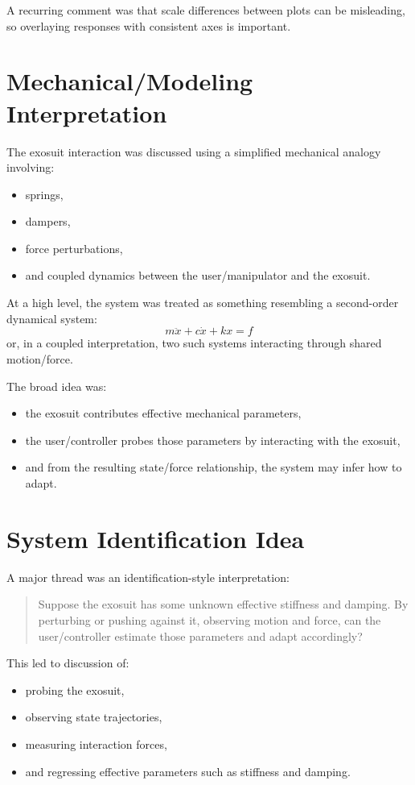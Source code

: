 \documentclass[11pt]{article}
\begin{document}
A recurring comment was that scale differences between plots can be misleading, so overlaying responses with consistent axes is important.

\section{Mechanical/Modeling Interpretation}
The exosuit interaction was discussed using a simplified mechanical analogy involving:
\begin{itemize}[leftmargin=1.5em]
    \item springs,
    \item dampers,
    \item force perturbations,
    \item and coupled dynamics between the user/manipulator and the exosuit.
\end{itemize}

At a high level, the system was treated as something resembling a second-order dynamical system:
\[
m\ddot{x} + c\dot{x} + kx = f
\]
or, in a coupled interpretation, two such systems interacting through shared motion/force.

The broad idea was:
\begin{itemize}[leftmargin=1.5em]
    \item the exosuit contributes effective mechanical parameters,
    \item the user/controller probes those parameters by interacting with the exosuit,
    \item and from the resulting state/force relationship, the system may infer how to adapt.
\end{itemize}

\section{System Identification Idea}
A major thread was an identification-style interpretation:

\begin{quote}
Suppose the exosuit has some unknown effective stiffness and damping. By perturbing or pushing against it, observing motion and force, can the user/controller estimate those parameters and adapt accordingly?
\end{quote}

This led to discussion of:
\begin{itemize}[leftmargin=1.5em]
    \item probing the exosuit,
    \item observing state trajectories,
    \item measuring interaction forces,
    \item and regressing effective parameters such as stiffness and damping.
\end{itemize}
\end{document}
